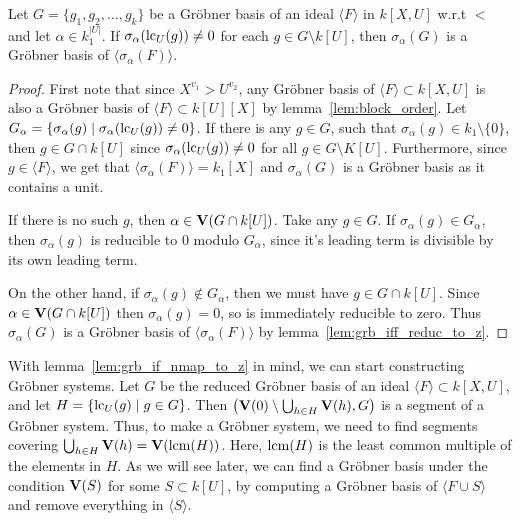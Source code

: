 \begin{lemma}\label{lem:grb_if_nmap_to_z}
  Let $G = \{g_{1}, g_{2}, \dots, g_{k}\}$ be a Gröbner basis of an ideal $\langle F \rangle$ in $k[X, U]$ w.r.t $<$ and let $\alpha \in k_{1}^{|U|}$. If $\sigma_{\alpha}(\operatorname{lc}_{U}(g)) \neq 0$ for each $g \in G \setminus k[U]$, then $\sigma_{\alpha}(G)$ is a Gröbner basis of $\langle \sigma_{\alpha}(F) \rangle$.
\end{lemma}
\begin{proof}
  First note that since $X^{v_{1}} > U^{v_{2}}$, any Gröbner basis of $\langle F \rangle \subset k[X, U]$ is also a Gröbner basis of $\langle F \rangle \subset k[U][X]$ by lemma~\ref{lem:block_order}. Let $G_{\alpha} = \{\sigma_{\alpha}(g) \mid \sigma_{\alpha}(\operatorname{lc}_{U}(g)) \neq 0\}$. If there is any $g \in G$, such that $\sigma_{\alpha}(g) \in k_{1} \setminus \{0\}$, then $g \in G \cap k[U]$ since $\sigma_{\alpha}(\operatorname{lc}_{U}(g)) \neq 0$ for all $g \in G \setminus K[U]$. Furthermore, since $g \in \langle F \rangle$, we get that $\langle \sigma_{\alpha}(F) \rangle = k_{1}[X]$ and $\sigma_{\alpha}(G)$ is a Gröbner basis as it contains a unit.

  If there is no such $g$, then $\alpha \in \operatorname{\mathbf V}(G \cap k[U])$. Take any $g \in G$. If $\sigma_{\alpha}(g) \in G_{\alpha}$, then $\sigma_{\alpha}(g)$ is reducible to $0$ modulo $G_{\alpha}$, since it's leading term is divisible by its own leading term.

  On the other hand, if $\sigma_{\alpha}(g) \notin G_{\alpha}$, then we must have $g \in G \cap k[U]$. Since $\alpha \in \operatorname{\mathbf V}(G \cap k[U])$ then $\sigma_{\alpha}(g) = 0$, so is immediately reducible to zero. Thus $\sigma_{\alpha}(G)$ is a Gröbner basis of $\langle \sigma_{\alpha}(F) \rangle$ by lemma~\ref{lem:grb_iff_reduc_to_z}.
\end{proof}

With lemma~\ref{lem:grb_if_nmap_to_z} in mind, we can start constructing Gröbner systems. Let $G$ be the reduced Gröbner basis of an ideal $\langle F \rangle \subset k[X, U]$, and let $H = \{\operatorname{lc}_{U}(g) \mid g \in G \}$. Then $\left(\operatorname{\mathbf V}(0) \setminus \bigcup_{h \in H} \operatorname{\mathbf V}(h), G\right)$ is a segment of a Gröbner system. Thus, to make a Gröbner system, we need to find segments covering $\bigcup_{h \in H} \operatorname{\mathbf V}(h) = \operatorname{\mathbf V}(\operatorname{lcm}(H))$. Here, $\operatorname{lcm}(H)$ is the least common multiple of the elements in $H$. As we will see later, we can find a Gröbner basis under the condition $\operatorname{\mathbf V}(S)$ for some $S \subset k[U]$, by computing a Gröbner basis of $\langle F \cup S \rangle$ and remove everything in $\langle S \rangle$.

